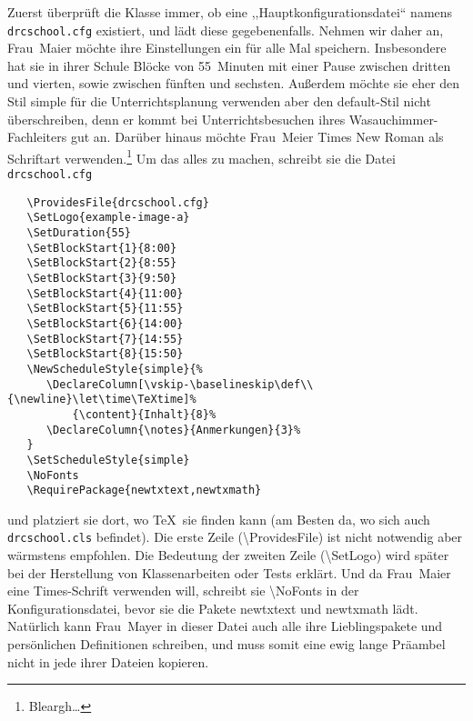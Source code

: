 \documentclass[hyperworksheet]{drcschool}
\newcommand*{\cs}[1]{\textup{\ttfamily\textbackslash#1}}                        %
\newcommand*{\pkg}[1]{\textup{\ttfamily#1}}                                     %
\newcommand*{\opt}[1]{\textup{\ttfamily#1}}                                     %
\begin{document}
Zuerst überprüft die Klasse immer, ob eine ,,Hauptkonfigurationsdatei`` namens
\texttt{drcschool.cfg} existiert, und lädt diese gegebenenfalls.
Nehmen wir daher an, Frau~Maier möchte ihre Einstellungen ein für alle Mal speichern.
Insbesondere hat sie in ihrer Schule Blöcke von 55~Minuten mit einer Pause zwischen
dritten und vierten, sowie zwischen fünften und sechsten. Außerdem möchte sie
eher den Stil \opt{simple} für die Unterrichtsplanung verwenden aber den
\opt{default}-Stil nicht überschreiben, denn er kommt bei Unterrichtsbesuchen
ihres Wasauchimmer-Fachleiters gut an. Darüber hinaus möchte Frau~Meier
Times New Roman als Schriftart verwenden.\footnote{Bleargh\ldots}
Um das alles zu machen, schreibt sie die Datei \texttt{drcschool.cfg}
\begin{verbatim}
   \ProvidesFile{drcschool.cfg}
   \SetLogo{example-image-a}
   \SetDuration{55}
   \SetBlockStart{1}{8:00}
   \SetBlockStart{2}{8:55}
   \SetBlockStart{3}{9:50}
   \SetBlockStart{4}{11:00}
   \SetBlockStart{5}{11:55}
   \SetBlockStart{6}{14:00}
   \SetBlockStart{7}{14:55}
   \SetBlockStart{8}{15:50}
   \NewScheduleStyle{simple}{%
      \DeclareColumn[\vskip-\baselineskip\def\\{\newline}\let\time\TeXtime]%
          {\content}{Inhalt}{8}%
      \DeclareColumn{\notes}{Anmerkungen}{3}%
   }
   \SetScheduleStyle{simple}
   \NoFonts
   \RequirePackage{newtxtext,newtxmath}
\end{verbatim}
und platziert sie dort, wo \TeX\ sie finden kann
(am Besten da, wo sich auch \texttt{drcschool.cls} befindet).
Die erste Zeile (\cs{ProvidesFile}) ist nicht notwendig aber wärmstens empfohlen.
Die Bedeutung der zweiten Zeile (\cs{SetLogo}) wird später bei der Herstellung
von Klassenarbeiten oder Tests erklärt. Und da Frau~Maier eine Times-Schrift
verwenden will, schreibt sie \cs{NoFonts} in der Konfigurationsdatei, bevor sie
die Pakete \pkg{newtxtext} und \pkg{newtxmath} lädt. Natürlich kann Frau~Mayer
in dieser Datei auch alle ihre Lieblingspakete und persönlichen Definitionen
schreiben, und muss somit eine ewig lange Präambel nicht in jede ihrer Dateien
kopieren.
\end{document}
